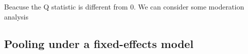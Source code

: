 \documentclass[
]{book}
\newenvironment{Shaded}{\begin{snugshade}}{\end{snugshade}}
\newcommand{\AttributeTok}[1]{\textcolor[rgb]{0.77,0.63,0.00}{#1}}
\newcommand{\CommentTok}[1]{\textcolor[rgb]{0.56,0.35,0.01}{\textit{#1}}}
\newcommand{\FunctionTok}[1]{\textcolor[rgb]{0.00,0.00,0.00}{#1}}
\newcommand{\NormalTok}[1]{#1}
\newcommand{\OtherTok}[1]{\textcolor[rgb]{0.56,0.35,0.01}{#1}}
\newcommand{\SpecialCharTok}[1]{\textcolor[rgb]{0.00,0.00,0.00}{#1}}
\newcommand{\StringTok}[1]{\textcolor[rgb]{0.31,0.60,0.02}{#1}}
\begin{document}
Beacuse the Q statistic is different from 0. We can consider some moderation analysis

\hypertarget{pooling-under-a-fixed-effects-model}{%
\subsection{Pooling under a fixed-effects model}\label{pooling-under-a-fixed-effects-model}}

\begin{Shaded}
\end{Shaded}
\end{document}
